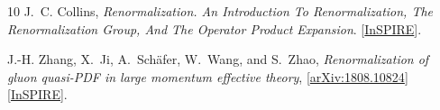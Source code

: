 \begin{thebibliography}{10}
J.~C. Collins, {\em {Renormalization. An Introduction To Renormalization, The
  Renormalization Group, And The Operator Product Expansion}}.
\newblock
{} [\href{http://inspirehep.net/record/209810}{{\ttfamily InSPIRE}}].
\newblock

J.-H. Zhang, X.~Ji, A.~Sch\"afer, W.~Wang, and S.~Zhao,
{\it {Renormalization of gluon quasi-PDF in large momentum effective theory}},
  [\href{http://arxiv.org/abs/1808.10824}{{\ttfamily arXiv:1808.10824}}]
  [\href{http://inspirehep.net/record/1692401}{{\ttfamily InSPIRE}}].

\end{thebibliography}\endgroup
